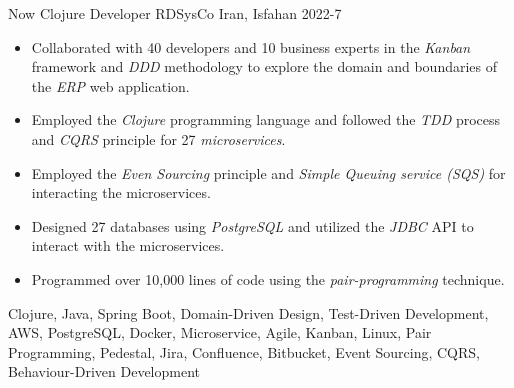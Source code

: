 
\begin{experiences}
\experience
{Now}
{Clojure Developer}
{RDSysCo}
{Iran, Isfahan}
{2022-7}
{
\begin{itemize}
\item Collaborated with 40 developers and 10 business experts in the \emph{Kanban} framework and \emph{DDD} methodology to explore the domain and boundaries of the \textit{ERP} web application.
\item Employed the \emph{Clojure} programming language and followed the \emph{TDD} process and \textit{CQRS} principle for 27 \emph{microservices}.
\item Employed the \textit{Even Sourcing} principle and \textit{Simple Queuing service (SQS)} for interacting the microservices.
\item Designed 27 databases using \emph{PostgreSQL} and utilized the \emph{JDBC} API to interact with the microservices.
\item Programmed over 10,000 lines of code using the \emph{pair-programming} technique.
\end{itemize}
}
{Clojure, Java, Spring Boot, Domain-Driven Design, Test-Driven Development, AWS, PostgreSQL, Docker, Microservice, Agile, Kanban, Linux, Pair Programming, Pedestal, Jira, Confluence, Bitbucket, Event Sourcing, CQRS, Behaviour-Driven Development}

\emptySeparator


\end{experiences}
